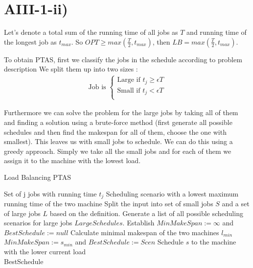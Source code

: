 \section*{AIII-1-ii)}
\label{approx-3-1-ii}

Let's denote a total sum of the running time of all jobs as $ T $ and running time of the longest job as $ t_{max} $.
So $OPT \geq max(\frac{T}{2}, t_{max})$, then $LB = max(\frac{T}{2}, t_{max})$.

To obtain PTAS, first we classify the jobs in the schedule according to problem description
We split them up into two sizes :
\begin{align*}
    \text{Job is } \begin{cases}
        \text{Large} \text{ if } t_j \ge \epsilon T \\
        \text{Small} \text{ if } t_j < \epsilon T \\
    \end{cases}
\end{align*}

Furthermore we can solve the problem for the large jobs by taking all of them and finding a solution using a brute-force method
(first generate all possible schedules and then find the makespan for all of them, choose the one with smallest).
This leaves us with small jobs to schedule. We can do this using a greedy approach. Simply we take all the small jobs and for each
of them we assign it to the machine with the lowest load.

\begin{algorithm}[H]
  \caption{Load Balancing PTAS}
  \label{alg:load_balancing_ptas}
  \begin{algorithmic}
    \Require Set of j jobs with running time $t_j$
    \Ensure Scheduling scenario with a lowest maximum running time of the two machine 
    \renewcommand{\algorithmicrequire}{\textbf{Input:}}
    \renewcommand{\algorithmicensure}{\textbf{Output:}}
    \algnewcommand{}
    \algnewcommand\Operation{\item[\algorithmicoperation]}
    \Operation
    \State Split the input into set of small jobs $ S $ and a set of large jobs $ L $  based on the definition.
    \State Generate a list of all possible scheduling scenarios for large jobs $ LargeSchedules $.
    \State Establish $ MinMakeSpan := \infty $ and $ BestSchedule:= null $
    \State Calculate minimal makespan of the two machines $ l_{min} $
    \State $ MinMakeSpan := s_{min} $ and $ BestSchedule := Scen $
    \EndIf
    \EndFor
    \State Schedule $ s $ to the machine with the lower current load
    \EndFor\\
    \Return BestSchedule
  \end{algorithmic}
\end{algorithm}

